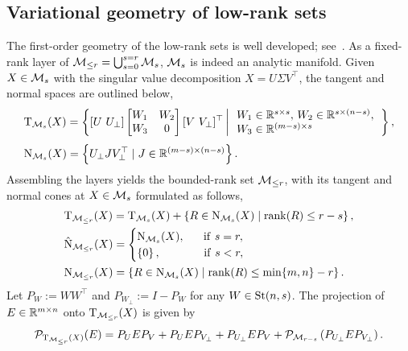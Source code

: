 \subsection{Variational geometry of low-rank sets}
The first-order geometry of the low-rank sets is well developed; see~\cite{luke2013Mordukhovichcone,vandereycken2013lowrankcompletion,schneider2015Lojaconvergence}. As a fixed-rank layer of {$\mathcal{M}_{\le r}=\bigcup_{s=0}^{s=r}\mathcal{M}_{s}$}, $\mathcal{M}_{s}$ is indeed an analytic manifold. Given $X\in\mathcal{M}_{s}$ with the singular value decomposition $X=U\varSigma V^\top$, the tangent and normal spaces are outlined below, 
\begin{align}
     & \mathrm{T}_{\mathcal{M}_{s}}(X) = \left\{ {[U\ U_{\bot}]\left[ \begin{matrix}
        	W_1&		W_2\\
        	W_3&		0\\
        \end{matrix} \right][V\ V_{\bot}]^\top \left|\,\begin{array}{l}
        W_1\in\mathbb{R}^{s\times s},\, W_2\in\mathbb{R}^{s\times (n-s)},
        \\
        W_3\in\mathbb{R}^{(m-s)\times s}
        \end{array}\right.
        } \right\},  \label{eq:Tcone_lowrank}
    \\[1mm]
    &\mathrm{N}_{\mathcal{M}_{s}}(X) = \left\{ {U_\bot JV_\bot^\top\mid J\in\mathbb{R}^{(m-s)\times (n-s)}} \right\}. \label{eq:Ncone_lowrank}
\end{align}
Assembling the layers yields the bounded-rank set $\mathcal{M}_{\le r}$, with its tangent and normal cones at {$X\in\mathcal{M}_{s}$} formulated as follows,
\begin{align}
    &\mathrm{T}_{\mathcal{M}_{\le r}}(X) = \mathrm{T}_{\mathcal{M}_{s}}(X) + \left\{ {R\in\mathrm{N}_{\mathcal{M}_{s}}(X)\mid\operatorname{rank}(R)\le r-s} \right\}, \label{eq:Btangent_cone_boundedrank}
    \\
    &\hat{\mathrm{N}}_{\mathcal{M}_{\le r}}(X) = \begin{cases}
        \mathrm{N}_{\mathcal{M}_{s}}(X),\,\,\quad \ \mathrm{if}\,\,s=r,\\
    \left\{ 0 \right\}, \,\,\quad\quad\quad \ \,  \mathrm{if}\,\,s<r,
    \end{cases} \label{eq:Fnormal_cone_boundedrank}
    \\
    &\mathrm{N}_{\mathcal{M}_{\le r}}(X) = \left\{ {R\in\mathrm{N}_{\mathcal{M}_{s}}(X)\mid\operatorname{rank}(R)\le \min\{m,n\}-r} \right\}.
    \label{eq:Lnormal_cone_boundedrank}
\end{align}
{Let $P_W := WW^\top$ and $P_{W_\bot}:=I-P_W$ for any $W\in\mathrm{St}(n,s)$.} The projection of $E\in\mathbb{R}^{m\times n}$ onto $\mathrm{T}_{\mathcal{M}_{\le r}}(X)$ is given by
\begin{equation*}
    \mathcal{P}_{\mathrm{T}_{\mathcal{M}_{\le r}}(X)}(E) = P_UEP_V + P_UEP_{V_\bot} + P_{U_\bot}EP_V + \mathcal{P}_{\mathcal{M}_{r-s}} \left( {P_{U_\bot}EP_{V_\bot}} \right).
\end{equation*}

